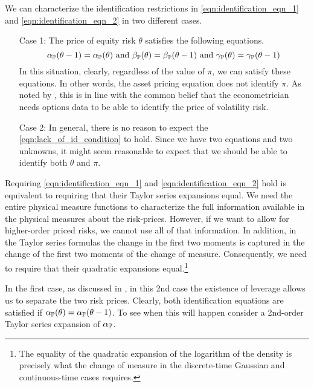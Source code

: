 \documentclass[11pt, letterpaper, twoside, final]{article}
\begin{document}
We can characterize the identification restrictions in \cref{eqn:identification_eqn_1} and
\cref{eqn:identification_eqn_2} in two different cases.   

\begin{enumerate}
    \item[Case 1:] The price of equity risk $\theta$ satisfies the following equations. 
        \begin{equation}
            \alpha_{\PP}(\theta - 1) = \alpha_{\PP}(\theta)\ \text{and}\ \beta_{\PP}(\theta) = \beta_{\PP}(\theta
            -1)\ \text{and}\ \gamma_{\PP}(\theta) = \gamma_{\PP}(\theta - 1)
            \label{eqn:lack_of_id_condition}
        \end{equation}
        In this situation, clearly, regardless of the value of $\pi$, we can satisfy these equations.
        In other words, the asset pricing equation does not identify $\pi$. 
        As noted by \textcite{khrapov2016affine}, this is in line with the common belief that the econometrician
        needs options data to be able to identify the price of volatility risk. 
    \item[Case 2:] 
        In general, there is no reason to expect the \cref{eqn:lack_of_id_condition} to hold.
        Since we have two equations and two unknowns, it might seem reasonable to expect that we should be able to
        identify both $\theta$ and $\pi$.
\end{enumerate}

Requiring \cref{eqn:identification_eqn_1} and \cref{eqn:identification_eqn_2} hold is equivalent to
requiring that their Taylor series expansions equal.
We need the entire physical measure functions to characterize the full information available in the physical
measures about the risk-prices.
However, if we want to allow for higher-order priced risks, we cannot use all of that information.
In addition, in the Taylor series formulas the change in the first two moments is captured in the change of the
first two moments of the change of measure.
Consequently, we need to require that their quadratic expansions equal.\footnote{The equality of the quadratic
    expansion of the logarithm of the density is precisely what the change of measure in the discrete-time
Gaussian and continuous-time cases requires.}


In the first case, as discussed in \textcite[13]{khrapov2016affine}, in this 2nd case the existence of leverage
allows us to separate the two risk prices.
Clearly, both identification equations are satisfied if $\alpha_{\mathbb{P}}(\theta) = \alpha_{\mathbb{P}}(\theta -1)$.
To see when this will happen consider a 2nd-order Taylor series expansion of $\alpha_{\mathbb{P}}$.
\end{document}
